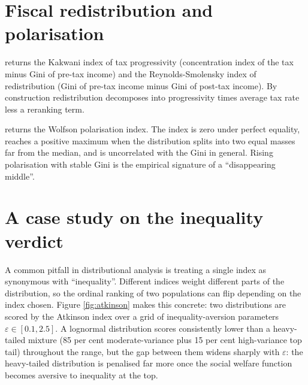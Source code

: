 \section{Fiscal redistribution and polarisation}\label{fiscal-redistribution-and-polarisation}

 returns the Kakwani index
of tax progressivity (concentration index of the tax minus Gini of
pre-tax income) and the Reynolds-Smolensky index of redistribution
(Gini of pre-tax income minus Gini of post-tax income). By
construction redistribution decomposes into progressivity times
average tax rate less a reranking term.

 returns the Wolfson polarisation
index. The index is zero under perfect equality, reaches a positive
maximum when the distribution splits into two equal masses far from
the median, and is uncorrelated with the Gini in general. Rising
polarisation with stable Gini is the empirical signature of a
``disappearing middle''.

\section{A case study on the inequality verdict}\label{a-case-study-on-the-inequality-verdict}

A common pitfall in distributional analysis is treating a single
index as synonymous with ``inequality''. Different indices weight
different parts of the distribution, so the ordinal ranking of two
populations can flip depending on the index chosen. Figure
\ref{fig:atkinson} makes this concrete: two distributions are scored
by the Atkinson index over a grid of inequality-aversion parameters
\(\varepsilon \in [0.1, 2.5]\). A lognormal distribution scores
consistently lower than a heavy-tailed mixture (85 per cent
moderate-variance plus 15 per cent high-variance top tail) throughout
the range, but the gap between them widens sharply with
\(\varepsilon\): the heavy-tailed distribution is penalised far more
once the social welfare function becomes aversive to inequality at
the top.

